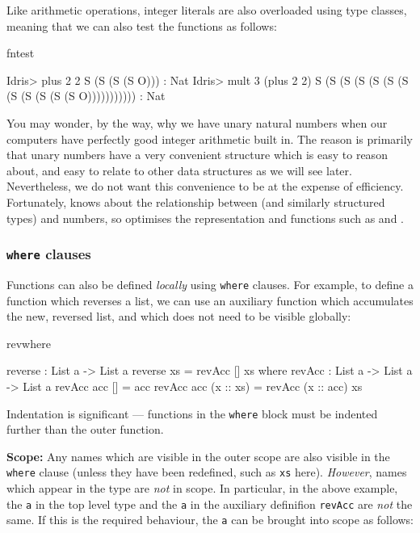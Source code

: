 \noindent
Like arithmetic operations, integer literals are also overloaded using type classes, 
meaning that we can also test the functions as follows:

\begin{SaveVerbatim}{fntest}

Idris> plus 2 2 
S (S (S (S O))) : Nat
Idris> mult 3 (plus 2 2)
S (S (S (S (S (S (S (S (S (S (S (S O))))))))))) : Nat

\end{SaveVerbatim}

\noindent
You may wonder, by the way, why we have unary natural numbers when our
computers have perfectly good integer arithmetic built in. The reason is
primarily that unary numbers have a very convenient structure which is easy to
reason about, and easy to relate to other data structures as we will see later.
Nevertheless, we do not want this convenience to be at the expense of
efficiency. Fortunately, \Idris{} knows about the relationship between
 (and similarly structured types) and numbers, so optimises the
representation and functions such as  and .

\subsubsection*{\texttt{where} clauses}

Functions can also be defined \emph{locally} using \texttt{where} clauses. For example,
to define a function which reverses a list, we can use an auxiliary function which
accumulates the new, reversed list, and which does not need to be visible globally:

\begin{SaveVerbatim}{revwhere}

reverse : List a -> List a
reverse xs = revAcc [] xs where
  revAcc : List a -> List a -> List a
  revAcc acc [] = acc
  revAcc acc (x :: xs) = revAcc (x :: acc) xs

\end{SaveVerbatim}

\noindent
Indentation is significant --- functions in the \texttt{where} block must be indented
further than the outer function.

\textbf{Scope:} 
Any names which are visible in the outer scope are also visible in the \texttt{where}
clause (unless they have been redefined, such as \texttt{xs} here).
\emph{However}, names which appear in the type are \emph{not} in scope. In particular,
in the above example, the \texttt{a} in the top level type and the \texttt{a} in the
auxiliary definifion \texttt{revAcc} are \emph{not} the same. If this is the required
behaviour, the \texttt{a} can be brought into scope as follows:

